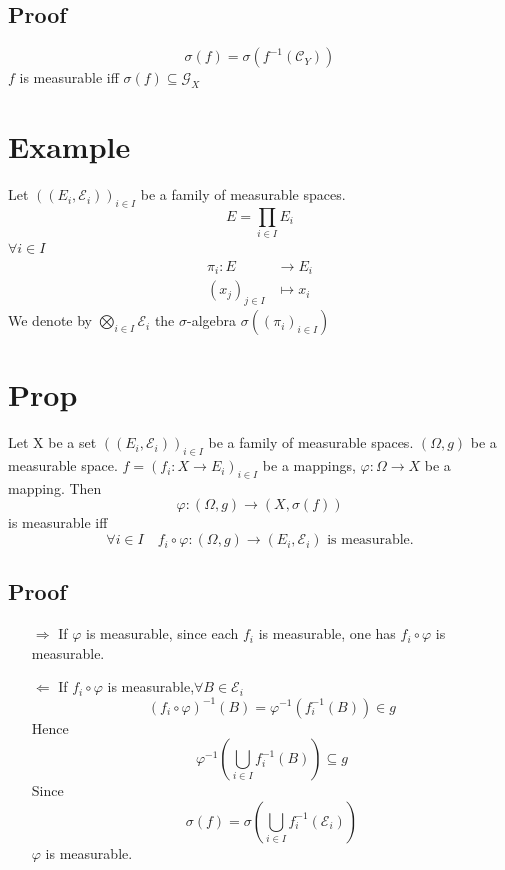 \documentclass{book}
\begin{document}
\subsection*{Proof}
$$\sigma(f)=\sigma(f^{-1}(\mathcal{C}_Y))$$
$f$ is measurable iff $\sigma(f)\subseteq \mathcal{G}_X$
\section{Example}
Let $((E_i,\mathcal{E}_i))_{i\in I}$ be a family of measurable spaces. 
$$E=\prod\limits_{i\in I}E_i$$
$\forall i\in I$$$\begin{aligned}
    \pi_i:E &\rightarrow E_i\\ (x_j)_{j\in I} &\mapsto x_i
\end{aligned}$$
We denote by $\bigotimes\limits_{i\in I}\mathcal{E}_i$ the $\sigma$-algebra $\sigma((\pi_i)_{i\in I})$
\section{Prop}
Let X be a set $((E_i,\mathcal{E}_i))_{i\in I}$ be a family of measurable spaces. $(\Omega,g)$ be a measurable space. $f=(f_i:X\rightarrow E_i)_{i\in I}$ be a mappings, $\varphi:\Omega\rightarrow X$ be a mapping. Then
$$\varphi:(\Omega,g)\rightarrow(X,\sigma(f))$$ is measurable iff
$$\forall i\in I\quad f_i\circ\varphi:(\Omega,g)\rightarrow(E_i,\mathcal{E}_i) \text{ is measurable.}$$
\subsection*{Proof}
\begin{itemize}
    \item [$\Rightarrow$]If $\varphi$ is measurable, since each $f_i$ is measurable, one has $f_i\circ \varphi$ is measurable.
    \item [$\Leftarrow$]If $f_i\circ \varphi$ is measurable,$\forall B\in \mathcal{E}_i$
    $$(f_i\circ\varphi)^{-1}(B)=\varphi^{-1}(f_i^{-1}(B))\in g$$
    Hence $$\varphi^{-1}(\bigcup\limits_{i\in I}f_i^{-1}(B))\subseteq g$$
    Since $$\sigma(f)=\sigma(\bigcup\limits_{i\in I}f_i^{-1}(\mathcal{E}_i))$$ $\varphi$ is measurable.
\end{itemize}
\end{document}
